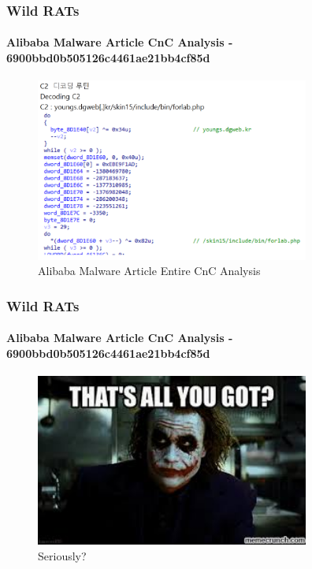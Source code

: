 \documentclass[aspectratio=169]{beamer}
\begin{document}
\begin{frame}
  \frametitle{Wild RATs}
  \framesubtitle{Alibaba Malware Article CnC Analysis - 6900bbd0b505126c4461ae21bb4cf85d}
  \begin{center}
    \begin{figure}
      \includegraphics[width=9cm,keepaspectratio]{alibaba_article_1}
      \caption{Alibaba Malware Article Entire CnC Analysis}
    \end{figure}
  \end{center}
\end{frame}

\begin{frame}
  \frametitle{Wild RATs}
  \framesubtitle{Alibaba Malware Article CnC Analysis - 6900bbd0b505126c4461ae21bb4cf85d}
  \begin{center}
    \begin{figure}
      \includegraphics[width=9cm,keepaspectratio]{thats_all_you_got}
      \caption{Seriously?}
    \end{figure}
  \end{center}
\end{frame}
\end{document}
